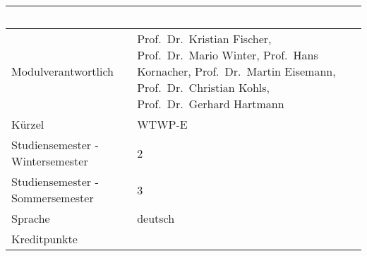 \begin{longtable}[]{@{}ll@{}}
\toprule
\begin{minipage}[b]{0.12\columnwidth}\raggedright\strut
~\strut
\end{minipage} & \begin{minipage}[b]{0.12\columnwidth}\raggedright\strut
~\strut
\end{minipage}\tabularnewline
\midrule
\endhead
\begin{minipage}[t]{0.12\columnwidth}\raggedright\strut
Modulverantwortlich\strut
\end{minipage} & \begin{minipage}[t]{0.12\columnwidth}\raggedright\strut
Prof.~Dr.~Kristian Fischer, Prof.~Dr.~Mario Winter, Prof.~Hans
Kornacher, Prof.~Dr.~Martin Eisemann, Prof.~Dr.~Christian Kohls,
Prof.~Dr.~Gerhard Hartmann\strut
\end{minipage}\tabularnewline
\begin{minipage}[t]{0.12\columnwidth}\raggedright\strut
Kürzel\strut
\end{minipage} & \begin{minipage}[t]{0.12\columnwidth}\raggedright\strut
WTWP-E\strut
\end{minipage}\tabularnewline
\begin{minipage}[t]{0.12\columnwidth}\raggedright\strut
Studiensemester - Wintersemester\strut
\end{minipage} & \begin{minipage}[t]{0.12\columnwidth}\raggedright\strut
2\strut
\end{minipage}\tabularnewline
\begin{minipage}[t]{0.12\columnwidth}\raggedright\strut
Studiensemester - Sommersemester\strut
\end{minipage} & \begin{minipage}[t]{0.12\columnwidth}\raggedright\strut
3\strut
\end{minipage}\tabularnewline
\begin{minipage}[t]{0.12\columnwidth}\raggedright\strut
Sprache\strut
\end{minipage} & \begin{minipage}[t]{0.12\columnwidth}\raggedright\strut
deutsch\strut
\end{minipage}\tabularnewline
\begin{minipage}[t]{0.12\columnwidth}\raggedright\strut
Kreditpunkte\strut
\end{minipage} & \begin{minipage}[t]{0.12\columnwidth}\raggedright\strut

\end{minipage}
\end{longtable}
